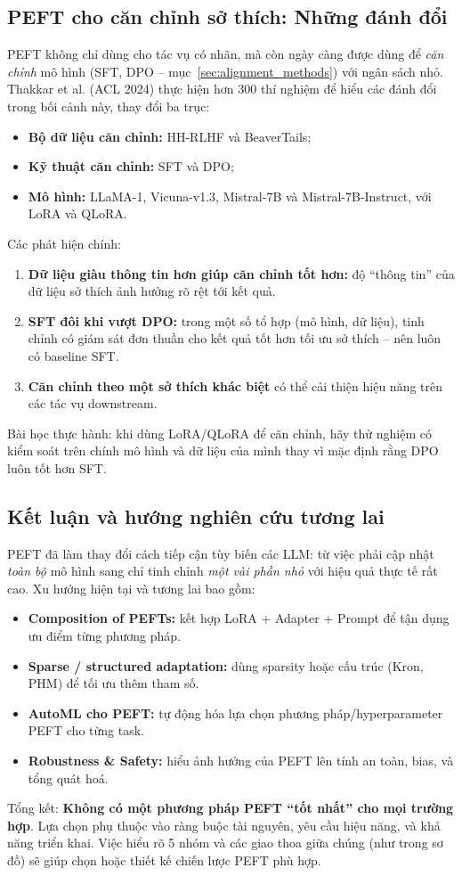 \subsection{PEFT cho căn chỉnh sở thích: Những đánh đổi \newtag}
\label{ssec:peft_alignment_tradeoffs}
PEFT không chỉ dùng cho tác vụ có nhãn, mà còn ngày càng được dùng để \emph{căn chỉnh} mô hình (SFT, DPO -- mục~\ref{sec:alignment_methods}) với ngân sách nhỏ. Thakkar et al. (ACL 2024) \cite{thakkar2024deepdive} thực hiện hơn 300 thí nghiệm để hiểu các đánh đổi trong bối cảnh này, thay đổi ba trục:
\begin{itemize}
	\item \textbf{Bộ dữ liệu căn chỉnh:} HH-RLHF và BeaverTails;
	\item \textbf{Kỹ thuật căn chỉnh:} SFT và DPO;
	\item \textbf{Mô hình:} LLaMA-1, Vicuna-v1.3, Mistral-7B và Mistral-7B-Instruct, với LoRA và QLoRA.
\end{itemize}
Các phát hiện chính:
\begin{enumerate}
	\item \textbf{Dữ liệu giàu thông tin hơn giúp căn chỉnh tốt hơn:} độ “thông tin” của dữ liệu sở thích ảnh hưởng rõ rệt tới kết quả.
	\item \textbf{SFT đôi khi vượt DPO:} trong một số tổ hợp (mô hình, dữ liệu), tinh chỉnh có giám sát đơn thuần cho kết quả tốt hơn tối ưu sở thích -- nên luôn có baseline SFT.
	\item \textbf{Căn chỉnh theo một sở thích khác biệt} có thể cải thiện hiệu năng trên các tác vụ downstream.
\end{enumerate}
Bài học thực hành: khi dùng LoRA/QLoRA để căn chỉnh, hãy thử nghiệm có kiểm soát trên chính mô hình và dữ liệu của mình thay vì mặc định rằng DPO luôn tốt hơn SFT.

\subsection{Kết luận và hướng nghiên cứu tương lai}
\label{ssec:conclusion}
PEFT đã làm thay đổi cách tiếp cận tùy biến các LLM: từ việc phải cập nhật \emph{toàn bộ} mô hình sang chỉ tinh chỉnh \emph{một vài phần nhỏ} với hiệu quả thực tế rất cao.  
Xu hướng hiện tại và tương lai bao gồm:
\begin{itemize}
	\item \textbf{Composition of PEFTs:} kết hợp LoRA + Adapter + Prompt để tận dụng ưu điểm từng phương pháp.
	\item \textbf{Sparse / structured adaptation:} dùng sparsity hoặc cấu trúc (Kron, PHM) để tối ưu thêm tham số.
	\item \textbf{AutoML cho PEFT:} tự động hóa lựa chọn phương pháp/hyperparameter PEFT cho từng task.
	\item \textbf{Robustness \& Safety:} hiểu ảnh hưởng của PEFT lên tính an toàn, bias, và tổng quát hoá.
\end{itemize}

Tổng kết: \textbf{Không có một phương pháp PEFT “tốt nhất” cho mọi trường hợp}. Lựa chọn phụ thuộc vào ràng buộc tài nguyên, yêu cầu hiệu năng, và khả năng triển khai. Việc hiểu rõ 5 nhóm và các giao thoa giữa chúng (như trong sơ đồ) sẽ giúp chọn hoặc thiết kế chiến lược PEFT phù hợp.